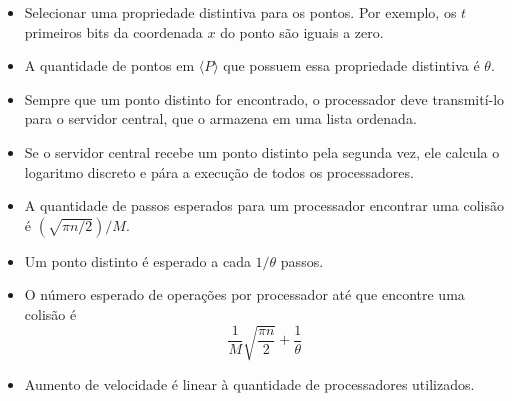 \documentclass{beamer}
\begin{document}
\begin{frame}
  \begin{itemize}
    \item Selecionar uma propriedade distintiva para os pontos. Por exemplo, os $t$ primeiros bits da coordenada $x$ do ponto são iguais a zero.
    \item A quantidade de pontos em $\langle P \rangle$ que possuem essa propriedade distintiva é $\theta$.
    \item Sempre que um ponto distinto for encontrado, o processador deve transmití-lo para o servidor central, que o armazena em uma lista ordenada.
    \item Se o servidor central recebe um ponto distinto pela segunda vez, ele calcula o logaritmo discreto e pára a execução de todos os processadores.
  \end{itemize}
\end{frame}
\begin{frame}
  \begin{itemize}
    \item A quantidade de passos esperados para um processador encontrar uma colisão é $(\sqrt{\pi n/2})/M$.
    \item Um ponto distinto é esperado a cada $1/\theta$ passos.
    \item O número esperado de operações por processador até que encontre uma colisão é
    $$
      \frac{1}{M}\sqrt{\frac{\pi n}{2}} + \frac{1}{\theta}
    $$
    \item Aumento de velocidade é linear à quantidade de processadores utilizados.
  \end{itemize}
\end{frame}

%
%

\end{document}
